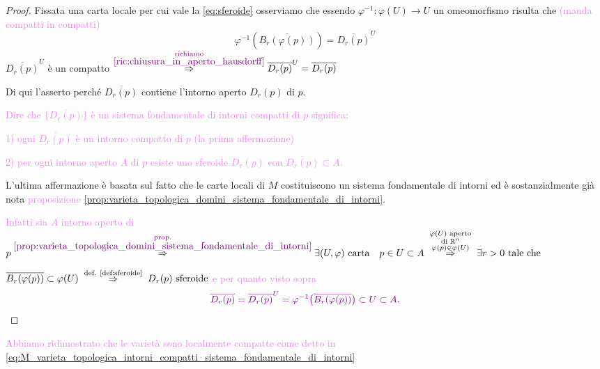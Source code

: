         \begin{proof}
        \mbox{}

        Fissata una carta locale per cui vale la \eqref{eq:sferoide} osserviamo che essendo $\varphi^{-1} \colon \varphi(U) \to U$ un omeomorfismo 
        risulta che \textcolor{violet}{(manda compatti in compatti)}
        \[
        \varphi^{-1}(\overline{B_r(\varphi(p))}) = \overline{D_r(p)}^U
        \]
        $\overline{D_r(p)}^U$ è un compatto $\overset{\textcolor{violet}{\substack{\text{richiamo} \\ \ref{ric:chiusura_in_aperto_hausdorff}}}}{\Rightarrow} \overline{D_r(p)}^U =\overline{D_r(p)}$  
        
        Di qui l'asserto perché $\overline{D_r(p)}$ contiene l'intorno aperto $D_r(p)$ di $p$. 
        
        \textcolor{violet}{Dire che $\{\overline{D_r(p)}\}$ è un sistema fondamentale di intorni compatti di $p$ significa:}

        \textcolor{violet}{1) ogni $\overline{D_r(p)}$ è un intorno compatto di $p$ (la prima affermazione)}
        
        \textcolor{violet}{2) per ogni intorno aperto $A$ di $p$ esiste uno sferoide $D_r(p)$ con $\overline{D_r(p)} \subset A$.}

        L'ultima affermazione è basata sul fatto che le carte locali di $M$ costituiscono un sistema
        fondamentale di intorni ed è sostanzialmente già nota \textcolor{violet}{proposizione \ref{prop:varieta_topologica_domini_sistema_fondamentale_di_intorni}}.

        \textcolor{violet}{Infatti sia $A$ intorno aperto di $p \overset{\textcolor{violet}{\substack{\text{prop.} \\  \ref{prop:varieta_topologica_domini_sistema_fondamentale_di_intorni}}}}{\Rightarrow}
        \exists (U,\varphi) \text{ carta} \quad p \in U \subset A
        \;\overset{\substack{\varphi(U) \text{ aperto} \\ \text{di } \mathbb{R}^n \\ \varphi(p)\in\varphi(U)}}{\Rightarrow}\;
        \exists r>0 \text{ tale che }$} 
        
        \textcolor{violet}{$\overline{B_r(\varphi(p))} \subset \varphi(U)
        \;\overset{\text{def. \ref{def:sferoide}}}{\Rightarrow}\;
        D_r(p) \text{ sferoide}$}
        \textcolor{violet}{e per quanto visto sopra}
        \[
        \textcolor{violet}{
        \overline{D_r(p)} = \overline{D_r(p)}^U = \varphi^{-1}\big(\overline{B_r(\varphi(p))}\big) \subset U \subset A .
        }
        \]
        \end{proof}
        \textcolor{violet}{Abbiamo ridimostrato che le varietà sono localmente 
        compatte come detto in \eqref{eq:M_varieta_topologica_intorni_compatti_sistema_fondamentale_di_intorni}}

